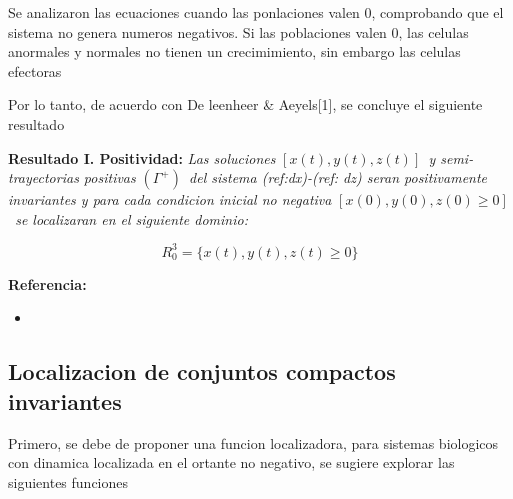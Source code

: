 \documentclass[letterpaper,11pt]{article}
\begin{document}
\bigskip

Se analizaron las ecuaciones cuando las ponlaciones valen $0$, comprobando
que el sistema no genera numeros negativos. Si las poblaciones valen 0, las
celulas anormales y normales no tienen un crecimimiento, sin embargo las
celulas efectoras

\bigskip

\bigskip Por lo tanto, de acuerdo con De leenheer \& Aeyels[1], se concluye
el siguiente resultado

\textbf{Resultado I. Positividad:} \textit{Las soluciones }$\left[ x\left(
t\right) ,y\left( t\right) ,z\left( t\right) \right] $\textit{\ y
semi-trayectorias positivas }$\left( \Gamma ^{+}\right) $\textit{\ del
sistema (ref:dx)-(ref: dz) seran positivamente invariantes y para cada
condicion inicial no negativa }$\left[ x\left( 0\right) ,y\left( 0\right)
,z\left( 0\right) \geq 0\right] $\textit{\ se localizaran en el siguiente
dominio:}

\begin{equation*}
R_{0}^{3}=\{x\left( t\right) ,y\left( t\right) ,z\left( t\right) \geq 0\}
\end{equation*}

\bigskip

\bigskip

\bigskip

\textbf{Referencia:}

\begin{itemize}
\item 
{}
\end{itemize}

\bigskip

\bigskip

\subsection{Localizacion de conjuntos compactos invariantes}

Primero, se debe de proponer una funcion localizadora, para sistemas
biologicos con dinamica localizada en el ortante no negativo, se sugiere
explorar las siguientes funciones
\end{document}
